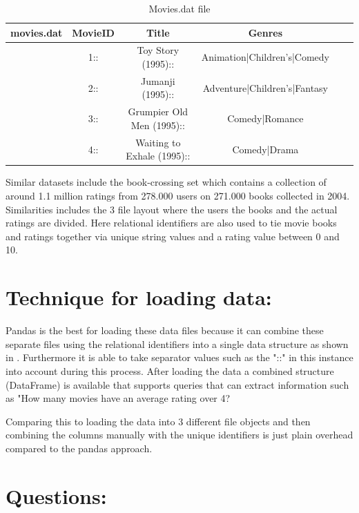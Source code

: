 \documentclass[12pt]{article}
\begin{document}
\begin{table}[H]
	\caption{Movies.dat file}
	\label{table:movies.dat}
	\centering
	\begin{tabular}{l*{4}{c}r}
		movies.dat & MovieID & Title & Genres \\
		\hline
		& 1:: & Toy Story (1995):: & Animation|Children's|Comedy \\
		& 2:: & Jumanji (1995)::  & Adventure|Children's|Fantasy \\
		& 3:: & Grumpier Old Men (1995):: & Comedy|Romance \\
		& 4:: & Waiting to Exhale (1995):: & Comedy|Drama \\
	\end{tabular}
\end{table}

Similar datasets include the book-crossing set \cite{Ziegler2005} which contains a collection of around 1.1 million ratings from 278.000 users on 271.000 books collected in 2004. Similarities includes the 3 file layout where the users the books and the actual ratings are divided. Here relational identifiers are also used to tie movie books and ratings together via unique string values and a rating value between 0 and 10.

\section{Technique for loading data:}

Pandas is the best for loading these data files because it can combine these separate files using the relational identifiers into a single data structure as shown in \cite{McKinney}. Furthermore it is able to take separator values such as the "::" in this instance into account during this process. After loading the data a combined structure (DataFrame) is available that supports queries that can extract information such as "How many movies have an average rating over 4?

Comparing this to loading the data into 3 different file objects and then combining the columns manually with the unique identifiers is just plain overhead compared to the pandas approach.

\section{Questions:}
\end{document}
